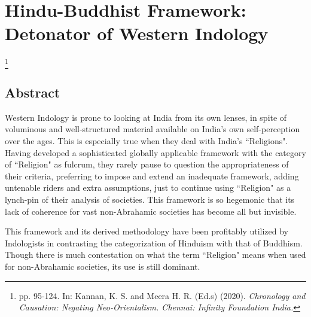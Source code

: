 
\chapter{Hindu-Buddhist Framework: Detonator of Western Indology}\label{chapter3}

\setcounter{endnote}{0}

\footnote{pp. 95-124. In: Kannan, K. S. and Meera H. R. (Ed.s) (2020). \textit{Chronology and Causation: Negating Neo-Orientalism. Chennai: Infinity Foundation India.}}


\section*{Abstract}

Western Indology is prone to looking at India from its own lenses, in spite of voluminous and well-structured material available on India's own self-perception over the ages. This is especially true when they deal with India's ``Religions". Having developed a sophisticated globally applicable framework with the category of ``Religion" as fulcrum, they rarely pause to question the appropriateness of their criteria, preferring to impose and extend an inadequate framework, adding untenable riders and extra assumptions, just to continue using ``Religion" as a lynch-pin of their analysis of societies. This framework is so hegemonic that its lack of coherence for vast non-Abrahamic societies has become all but invisible.

This framework and its derived methodology have been profitably utilized by Indologists in contrasting the categorization of Hinduism with that of Buddhism. Though there is much contestation on what the term ``Religion" means when used for non-Abrahamic societies, its use is still dominant.

\newpage

